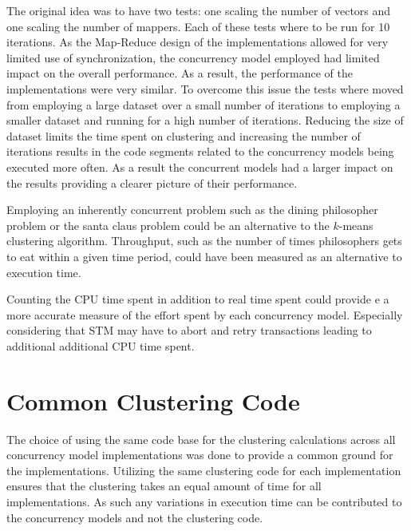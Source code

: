 The original idea was to have two tests: one scaling the number of vectors and one scaling the number of mappers. Each of these tests where to be run for 10 iterations. As the Map-Reduce design of the implementations allowed for very limited use of synchronization, the concurrency model employed had limited impact on the overall performance. As a result, the performance of the implementations were very similar. To overcome this issue the tests where moved from employing a large dataset over a small number of iterations to employing a smaller dataset and running for a high number of iterations. Reducing the size of dataset limits the time spent on clustering and increasing the number of iterations results in the code segments related to the concurrency models being executed more often. As a result the concurrent models had a larger impact on the results providing a clearer picture of their performance.

Employing an inherently concurrent problem such as the dining philosopher problem\cite[p. 673]{hoare1978communicating} or the santa claus problem\cite{trono1994new} could be an alternative to the $k$-means clustering algorithm. Throughput, such as the number of times philosophers gets to eat within a given time period, could have been measured as an alternative to execution time.

Counting the CPU time spent in addition to real time spent could provide e a more accurate measure of the effort spent by each concurrency model. Especially considering that \ac{STM} may have to abort and retry transactions leading to additional additional CPU time spent.

\section{Common Clustering Code}
The choice of using the same code base for the clustering calculations across all concurrency model implementations was done to provide a common ground for the implementations. Utilizing the same clustering code for each implementation ensures that the clustering takes an equal amount of time for all implementations. As such any variations in execution time can be contributed to the concurrency models and not the clustering code. 


